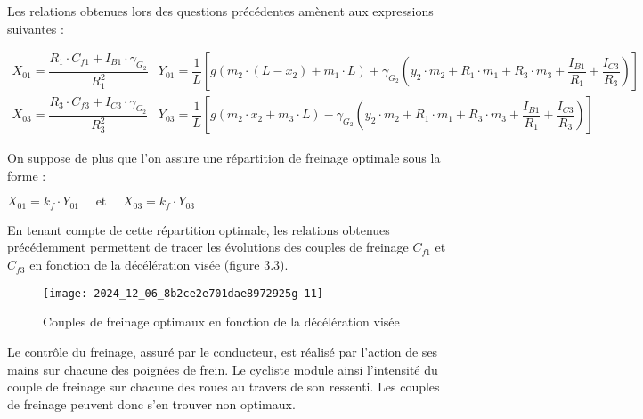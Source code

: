 Les relations obtenues lors des questions précédentes amènent aux expressions suivantes :

$
\begin{array}{ll}
X_{01}=\dfrac{R_{1} \cdot C_{f 1}+I_{B 1} \cdot \gamma_{G_{2}}}{R_{1}^{2}} & Y_{01}=\dfrac{1}{L}\left[g\left(m_{2} \cdot\left(L-x_{2}\right)+m_{1} \cdot L\right)+\gamma_{G_{2}}\left(y_{2} \cdot m_{2}+R_{1} \cdot m_{1}+R_{3} \cdot m_{3}+\dfrac{I_{B 1}}{R_{1}}+\dfrac{I_{C 3}}{R_{3}}\right)\right] \\
X_{03}=\dfrac{R_{3} \cdot C_{f 3}+I_{C 3} \cdot \gamma_{G_{2}}}{R_{3}^{2}} & Y_{03}=\dfrac{1}{L}\left[g\left(m_{2} \cdot x_{2}+m_{3} \cdot L\right)-\gamma_{G_{2}}\left(y_{2} \cdot m_{2}+R_{1} \cdot m_{1}+R_{3} \cdot m_{3}+\dfrac{I_{B 1}}{R_{1}}+\dfrac{I_{C 3}}{R_{3}}\right)\right]
\end{array}
$

On suppose de plus que l'on assure une répartition de freinage optimale sous la forme :

$
X_{01}=k_{f} \cdot Y_{01} \quad \text { et } \quad X_{03}=k_{f} \cdot Y_{03}
$

En tenant compte de cette répartition optimale, les relations obtenues précédemment permettent de tracer les évolutions des couples de freinage \(C_{f 1}\) et \(C_{f 3}\) en fonction de la décélération visée (figure 3.3).\\

\begin{figure}[!htb]
\begin{center}
\texttt{[image: 2024\_12\_06\_8b2ce2e701dae8972925g-11]}
\caption{Couples de freinage optimaux en fonction de la décélération visée \label{fig6}}
\end{center}
\end{figure}



Le contrôle du freinage, assuré par le conducteur, est réalisé par l'action de ses mains sur chacune des poignées de frein. Le cycliste module ainsi l'intensité du couple de freinage sur chacune des roues au travers de son ressenti. Les couples de freinage peuvent donc s'en trouver non optimaux.

